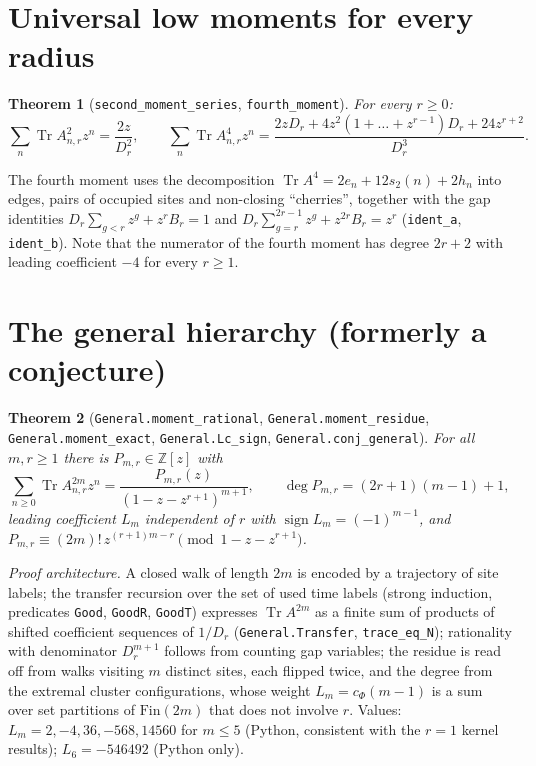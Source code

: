 \documentclass[11pt]{article}
\newtheorem{theorem}{Theorem}
\theoremstyle{remark}\newtheorem{remark}[theorem]{Remark}
\begin{document}
\section{Universal low moments for every radius}
\begin{theorem}[\texttt{second\_moment\_series}, \texttt{fourth\_moment}]
For every $r\ge0$:
\[\sum_n\operatorname{Tr}A_{n,r}^2z^n=\frac{2z}{D_r^2},\qquad
\sum_n\operatorname{Tr}A_{n,r}^4z^n=\frac{2zD_r+4z^2(1+\dots+z^{r-1})D_r+24z^{r+2}}{D_r^3}.\]
\end{theorem}
The fourth moment uses the decomposition $\operatorname{Tr}A^4=2e_n+12s_2(n)+2h_n$ into edges, pairs of occupied sites and non-closing ``cherries'', together with the gap identities $D_r\sum_{g<r}z^g+z^rB_r=1$ and $D_r\sum_{g=r}^{2r-1}z^g+z^{2r}B_r=z^r$ (\texttt{ident\_a}, \texttt{ident\_b}).
Note that the numerator of the fourth moment has degree $2r+2$ with leading coefficient $-4$ for every $r\ge1$.

\section{The general hierarchy (formerly a conjecture)}
\begin{theorem}[\texttt{General.moment\_rational}, \texttt{General.moment\_residue}, \texttt{General.moment\_exact}, \texttt{General.Lc\_sign}, \texttt{General.conj\_general}]
For all $m,r\ge1$ there is $P_{m,r}\in\mathbb Z[z]$ with
\[\sum_{n\ge0}\operatorname{Tr}A_{n,r}^{2m}z^n=\frac{P_{m,r}(z)}{(1-z-z^{r+1})^{m+1}},\qquad \deg P_{m,r}=(2r+1)(m-1)+1,\]
leading coefficient $L_m$ independent of $r$ with $\operatorname{sign}L_m=(-1)^{m-1}$, and $P_{m,r}\equiv(2m)!\,z^{(r+1)m-r}\pmod{1-z-z^{r+1}}$.
\end{theorem}
\emph{Proof architecture.} A closed walk of length $2m$ is encoded by a trajectory of site labels; the transfer recursion over the set of used time labels (strong induction, predicates \texttt{Good}, \texttt{GoodR}, \texttt{GoodT}) expresses $\operatorname{Tr}A^{2m}$ as a finite sum of products of shifted coefficient sequences of $1/D_r$ (\texttt{General.Transfer}, \texttt{trace\_eq\_N}); rationality with denominator $D_r^{m+1}$ follows from counting gap variables; the residue is read off from walks visiting $m$ distinct sites, each flipped twice, and the degree from the extremal cluster configurations, whose weight $L_m=c_\Phi(m-1)$ is a sum over set partitions of $\mathrm{Fin}(2m)$ that does not involve $r$.
Values: $L_m=2,-4,36,-568,14560$ for $m\le5$ (Python, consistent with the $r=1$ kernel results); $L_6=-546492$ (Python only).
\end{document}
